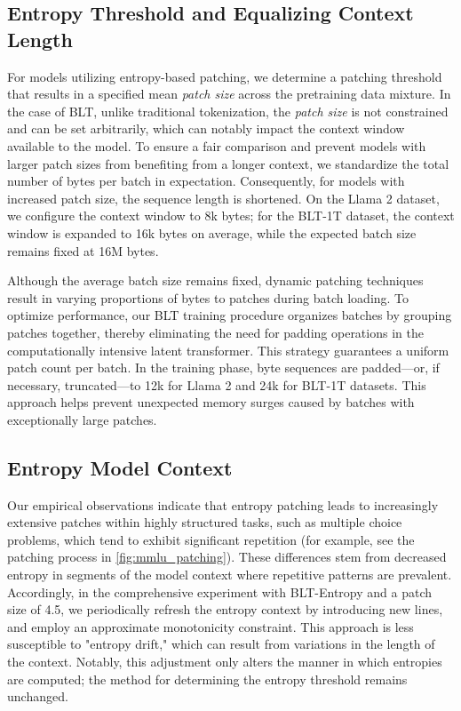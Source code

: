 \subsection{Entropy Threshold and Equalizing Context Length} For models utilizing entropy-based patching, we determine a patching threshold that results in a specified mean \textit{patch size} across the pretraining data mixture. In the case of {\textsc BLT}, unlike traditional tokenization, the \textit{patch size} is not constrained and can be set arbitrarily, which can notably impact the context window available to the model. To ensure a fair comparison and prevent models with larger patch sizes from benefiting from a longer context, we standardize the total number of bytes per batch in expectation. Consequently, for models with increased patch size, the sequence length is shortened. On the Llama 2 dataset, we configure the context window to 8k bytes; for the {\textsc BLT}-1T dataset, the context window is expanded to 16k bytes on average, while the expected batch size remains fixed at 16M bytes.

Although the average batch size remains fixed, dynamic patching techniques result in varying proportions of bytes to patches during batch loading. To optimize performance, our {\textsc BLT} training procedure organizes batches by grouping patches together, thereby eliminating the need for padding operations in the computationally intensive latent transformer. This strategy guarantees a uniform patch count per batch. In the training phase, byte sequences are padded—or, if necessary, truncated—to 12k for Llama 2 and 24k for {\textsc BLT}-1T datasets. This approach helps prevent unexpected memory surges caused by batches with exceptionally large patches.

\subsection{Entropy Model Context}
\label{section:entropy-context}
Our empirical observations indicate that entropy patching leads to increasingly extensive patches within highly structured tasks, such as multiple choice problems, which tend to exhibit significant repetition (for example, see the patching process in \autoref{fig:mmlu_patching}). These differences stem from decreased entropy in segments of the model context where repetitive patterns are prevalent. Accordingly, in the comprehensive experiment with {\textsc BLT}-Entropy and a patch size of 4.5, we periodically refresh the entropy context by introducing new lines, and employ an approximate monotonicity constraint. This approach is less susceptible to "entropy drift," which can result from variations in the length of the context. Notably, this adjustment only alters the manner in which entropies are computed; the method for determining the entropy threshold remains unchanged.


